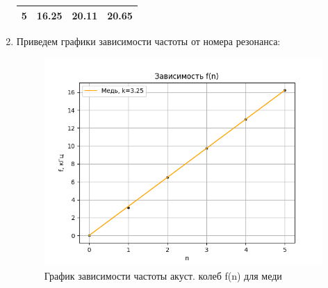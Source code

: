 \documentclass[a4paper, 10pt, twocolumn]{article}
\begin{document}
\begin{enumerate}
\begin{table}[h]
\begin{tabular}{|c||c|c|c|}
        5 & 16.25 & 20.11 & 20.65 \\ \hline
        \end{tabular}
    \end{table}
    \item Приведем графики зависимости частоты от номера резонанса:
    \begin{figure}[p]
        \includegraphics[width=1\linewidth]{graphs/figure1.png}
        \begin{center}
            \caption{График зависимости частоты акуст. колеб f(n) для меди}
        \end{center}
    \end{figure} 


\end{enumerate}
\end{document}
